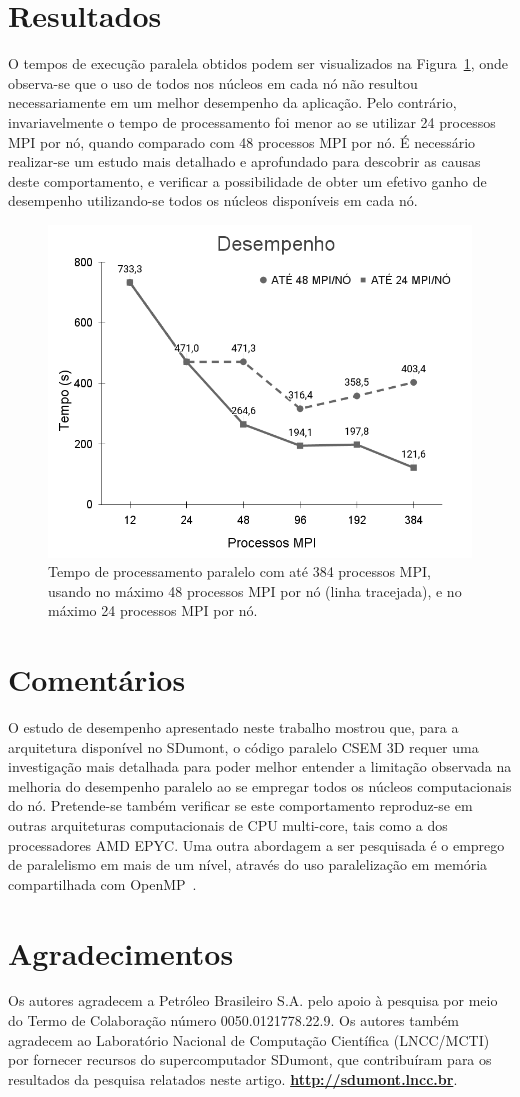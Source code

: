 \documentclass[12pt]{article}
\begin{document}
\section{Resultados}
%
O tempos de execução paralela obtidos podem ser visualizados na Figura~\ref{fig:perfpernode}, onde observa-se que o uso de todos nos núcleos em cada nó não resultou necessariamente em um melhor desempenho da aplicação. Pelo contrário, invariavelmente o tempo de processamento foi menor ao se utilizar 24 processos MPI por nó, quando comparado com 48 processos MPI por nó.
É necessário realizar-se um estudo mais detalhado e aprofundado para descobrir as causas deste comportamento, e verificar a possibilidade de obter um efetivo ganho de desempenho utilizando-se todos os núcleos disponíveis em cada nó.
%
\begin{figure}[ht]
\centering
\includegraphics[width=.5\textwidth]{figures/perfpernode.png}
\caption{Tempo de processamento paralelo com até 384 processos MPI, usando no máximo 48 processos MPI por nó (linha tracejada), e no máximo 24 processos MPI por nó.}
\label{fig:perfpernode}
\end{figure}


\section{Comentários}
O estudo de desempenho apresentado neste trabalho mostrou que, para a arquitetura disponível no SDumont, o código paralelo CSEM 3D requer uma investigação mais detalhada para poder melhor entender a limitação observada na melhoria do desempenho paralelo ao se empregar todos os núcleos computacionais do nó. Pretende-se também verificar se este comportamento reproduz-se em outras arquiteturas computacionais de CPU multi-core, tais como a dos processadores AMD EPYC\texttrademark. Uma outra abordagem a ser pesquisada é o emprego de paralelismo em mais de um nível, através do uso paralelização em memória compartilhada com OpenMP~\cite{OpenMP}.


\section*{Agradecimentos}
Os autores agradecem a Petróleo Brasileiro S.A. pelo apoio à pesquisa por meio do Termo de Colaboração número 0050.0121778.22.9. Os autores também agradecem ao Laboratório Nacional de Computação Científica (LNCC/MCTI) por fornecer recursos do supercomputador SDumont, que contribuíram para os resultados da pesquisa relatados neste artigo. \textbf{\url{http://sdumont.lncc.br}}.



\end{document}
